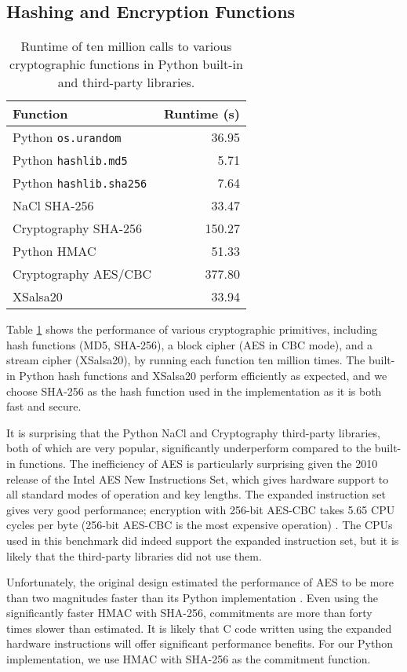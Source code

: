 \subsection{Hashing and Encryption Functions} \label{perf:crypto:hashenc}

\begin{table}[htbp]
\centering
\begin{tabular}{l | r}
  \textbf{Function} & \textbf{Runtime (s)} \\
  \hline
  Python \texttt{os.urandom} & 36.95 \\
  Python \texttt{hashlib.md5} & 5.71 \\
  Python \texttt{hashlib.sha256} & 7.64 \\
  NaCl SHA-256 & 33.47 \\
  Cryptography SHA-256 & 150.27 \\
  Python HMAC & 51.33 \\
  Cryptography AES/CBC & 377.80 \\
  XSalsa20 & 33.94
\end{tabular}
\caption[Performance measurements of cryptographic primitives]{Runtime of ten million calls to various cryptographic functions in Python built-in and third-party libraries.}
\label{table:perf:crypto}
\end{table}

Table \ref{table:perf:crypto} shows the performance of various cryptographic primitives, including hash functions (MD5, SHA-256), a block cipher (AES in CBC mode), and a stream cipher (XSalsa20), by running each function ten million times. The built-in Python hash functions and XSalsa20 perform efficiently as expected, and we choose SHA-256 as the hash function used in the implementation as it is both fast and secure.

It is surprising that the Python NaCl and Cryptography third-party libraries, both of which are very popular, significantly underperform compared to the built-in functions. The inefficiency of AES is particularly surprising given the 2010 release of the Intel AES New Instructions Set, which gives hardware support to all standard modes of operation and key lengths. The expanded instruction set gives very good performance; encryption with 256-bit AES-CBC takes 5.65 CPU cycles per byte (256-bit AES-CBC is the most expensive operation) \cite{intel}. The CPUs used in this benchmark did indeed support the expanded instruction set, but it is likely that the third-party libraries did not use them.

Unfortunately, the original design estimated the performance of AES to be more than two magnitudes faster than its Python implementation \cite{rrv}. Even using the significantly faster HMAC with SHA-256, commitments are more than forty times slower than estimated. It is likely that C code written using the expanded hardware instructions will offer significant performance benefits. For our Python implementation, we use HMAC with SHA-256 as the commitment function.

